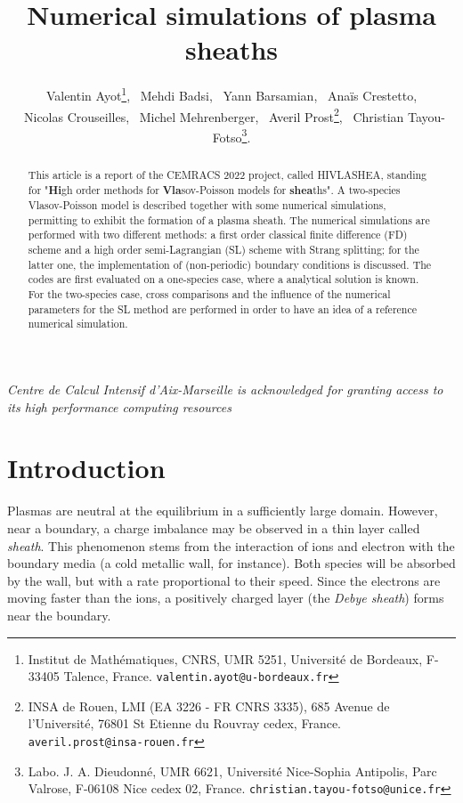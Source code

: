 \documentclass{article}
\title{Numerical simulations of plasma sheaths}
\author{
	Valentin Ayot\footnote{Institut de Math\'ematiques, CNRS, UMR 5251, Universit\'e de Bordeaux, F-33405 Talence, France. \texttt{valentin.ayot@u-bordeaux.fr}}, 
	\ Mehdi Badsi,
	\ Yann Barsamian, 
	\ Ana\"is Crestetto,\\
	\ Nicolas Crouseilles,
	\ Michel Mehrenberger,
	 \ Averil Prost\footnote{INSA de Rouen, LMI (EA 3226 - FR CNRS 3335), 685 Avenue de l'Universit\'e, 76801 St Etienne du Rouvray cedex, France. \texttt{averil.prost@insa-rouen.fr}}, 
	 \ Christian Tayou-Fotso\footnote{Labo. J. A. Dieudonn\'e, UMR 6621, Universit\'e Nice-Sophia Antipolis, Parc Valrose, F-06108 Nice cedex 02, France. \texttt{christian.tayou-fotso@unice.fr}}.
 }
\date{}
\numberwithin{equation}{section}
\begin{document}
	
\maketitle

\emph{Centre de Calcul Intensif d'Aix-Marseille is acknowledged for granting access to its high performance computing resources}

\begin{abstract}
	This article is a report of the   CEMRACS 2022 project, called HIVLASHEA, standing for "{\bf Hi}gh order methods for {\bf Vla}sov-Poisson models for {\bf shea}ths".
	A two-species Vlasov-Poisson model is described together with some numerical simulations, permitting to exhibit the formation of a plasma sheath. 
	The numerical simulations are performed with two different methods: a first order classical finite difference (FD) scheme and a high order semi-Lagrangian (SL) scheme with Strang splitting; for the latter one, the implementation
	of (non-periodic) boundary conditions is discussed. 
	The codes are first evaluated on a one-species case, where a analytical solution is known. For the two-species case, cross comparisons and the influence of the numerical parameters for the SL method are performed in order to have an idea of a reference numerical simulation.
\end{abstract}


\section{Introduction}
Plasmas are neutral at the equilibrium in a sufficiently large domain. However, near a boundary, a charge imbalance may be observed in a thin layer called \emph{sheath}.
This phenomenon stems from the interaction of ions and electron with the boundary media (a cold metallic wall, for instance). Both species will be absorbed by the wall, but with a rate proportional to their speed. Since the electrons are moving %
faster than the ions, a positively charged layer (the \emph{Debye sheath}) forms near the boundary. 
\end{document}

